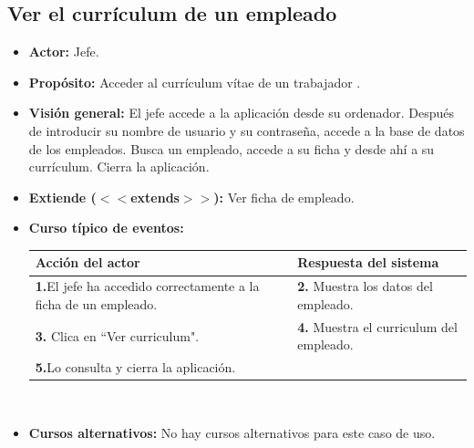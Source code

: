 \documentclass[spanish,a4paper,11pt, twoside]{report}	%
\begin{document}

	\subsection{Ver el currículum de un empleado}		
			\begin{itemize}
			\item \textbf{Actor:} Jefe.
			\item \textbf{Propósito:} Acceder al currículum vítae de un trabajador  .
			\item \textbf{Visión general:} El jefe accede a la aplicación desde su ordenador. Después de introducir su nombre de usuario y su contraseña, accede a la base de datos de los empleados. Busca un empleado, accede a su ficha y desde ahí a su currículum. Cierra la aplicación. 
			\item \textbf{Extiende ($<<$extends$>>$):} Ver ficha de empleado.
	\newpage
			\item \textbf{Curso típico de eventos:} 	\\
				\begin{tabular}{|p{6cm}||p{6cm}|}
				\hline
				\textbf{Acción del actor} & \textbf{Respuesta del sistema} \\ \hline \hline
				\textbf{1.}El jefe ha accedido correctamente a la ficha de un empleado. & \textbf{2.} Muestra los datos del empleado.\\ \hline
				\textbf{3.} Clica en “Ver curriculum".	& \textbf{4.} Muestra el curriculum del empleado. \\ \hline
				\textbf{5.}Lo consulta y cierra la aplicación. & \textbf{} \\ \hline
			\end{tabular}
			\\
			\item \textbf{Cursos alternativos:} No hay cursos alternativos para este caso de uso.
		\end{itemize}%



\end{document}
